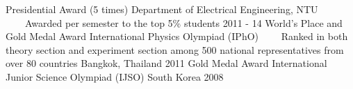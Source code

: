 \documentclass[12pt, a4paper]{awesome-cv}
\newif\ifelectronic
\newcommand{\tabitem}{~~\llap{\textbullet}~~}
\begin{document}
\begin{cvhonors}
    \cvhonor
    {Presidential Award (5 times)}
    {Department of Electrical Engineering, NTU \newline
    \tabitem Awarded per semester to the top 5\% students}
    {}
    {2011 - 14}
    \cvhonor
    {World's  Place and Gold Medal Award}
    {International Physics Olympiad (IPhO) \newline
    \tabitem Ranked  in both theory section and experiment section among 500 national representatives from over 80 countries \ifelectronic\quad\link{https://en.wikipedia.org/wiki/International_Physics_Olympiad}{[Winner List]}\fi}
    {Bangkok, Thailand}
    {2011}
    \cvhonor
    {Gold Medal Award}
    {International Junior Science Olympiad (IJSO)}
    {South Korea}
    {2008}
\end{cvhonors}

\newpage
\end{document}
